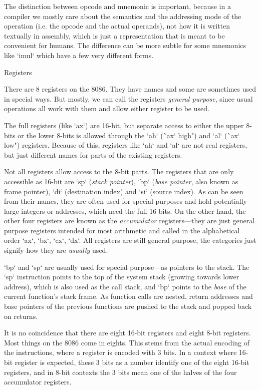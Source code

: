 The distinction between opcode and mnemonic is important, because in a compiler we
mostly care about the semantics and the addressing mode of the operation (i.e. the
opcode and the actual operands), not how it is written textually in assembly,
which is just a representation that is meant to be convenient for humans. The
difference can be more subtle for some mnemonics like `imul` which have a few
very different forms.

\secc Registers

There are 8 registers on the 8086. They have names and some are
sometimes used in special ways. But mostly, we can call the registers {\em general
purpose}, since usual operations all work with them and allow either register to
be used.

The full registers (like
`ax`) are 16-bit, but separate access to either the upper 8-bits or the lower 8-bits
is allowed through the `ah` (\"`ax` high") and `al` (\"`ax` low") registers.
Because of this, registers like `ah` and `al` are not real registers, but just
different names for parts of the existing registers.

Not all registers allow access to the 8-bit parts. The registers that are only
accessible as 16-bit are `sp` ({\em stack pointer}), `bp` ({\em base pointer},
also known as frame pointer), `di` (destination index) and `si` (source index).
As can be seen from their names, they are often used for special purposes and
hold potentially large integers or addresses, which need the full 16 bits. On
the other hand, the other four registers are known as the {\em accumulator}
registers---they are just general purpose registers intended for most arithmetic
and called in the alphabetical order `ax`, `bx`, `cx`, `dx`. All registers are
still general purpose, the categories just signify how they are {\em
usually} used.

`bp` and `sp` are usually used for special purpose---as pointers to
the stack. The `sp` instruction points to the top of the system stack (growing
towards lower address), which is also used as
the call stack, and `bp` points to the {\em base} of the current function's stack
frame. As function calls are nested, return addresses and base pointers of the
previous functions are pushed to the stack and popped back on returns.

It is no coincidence that there are eight 16-bit registers and eight 8-bit registers.
Most things on the 8086 come in eights. This stems from the actual encoding of the
instructions, where a register is encoded with 3 bits. In a context where 16-bit
register is expected, these 3 bits as a number identify one of the eight 16-bit
registers, and in 8-bit contexts the 3 bits mean one of the halves of the
four accumulator registers.

